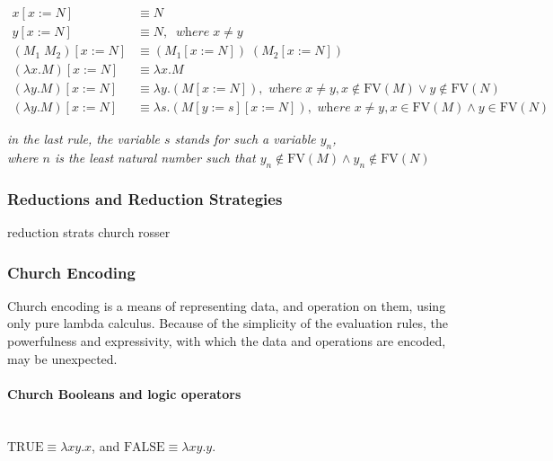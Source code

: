\documentclass[a4paper,10pt]{article}
\begin{document}
\begin{align*}
	x[x := N] &\equiv N\\
	y[x := N] &\equiv N,\;\;\textit{where}\;x \not= y\\
	(M_1\;M_2)[x := N] &\equiv (M_1[x := N])\;(M_2[x := N])\\
	(\lambda x.M)[x := N] &\equiv \lambda x.M\\
	(\lambda y.M)[x := N] &\equiv \lambda y.(M[x := N]),\textit{ where}\;x \not= y, x \not\in \mathrm{FV}(M) \lor y \not\in \mathrm{FV}(N)\\
	(\lambda y.M)[x := N] &\equiv \lambda s.(M[y := s][x := N]),\textit{ where}\;x \not= y, x\in \mathrm{FV}(M) \land y \in \mathrm{FV}(N)
\end{align*}
\begin{center}
\textit{in the last rule, the variable $s$ stands for such a variable $y_n$,
\\where $n$ is the least natural number such that $y_n \not\in \mathrm{FV}(M) \land y_n \not\in \mathrm{FV}(N)$}
\end{center}

\subsubsection{Reductions and Reduction Strategies}

reduction strats
church rosser

\subsubsection{Church Encoding}
Church encoding is a means of representing data, and operation on them, using
only pure lambda calculus. Because of the simplicity of the evaluation rules, the powerfulness
and expressivity, with which the data and operations are encoded, may be unexpected.

\paragraph{Church Booleans and logic operators}~\\

$\mathrm{TRUE} \equiv \lambda xy.x$, and $\mathrm{FALSE} \equiv \lambda xy.y$.
\end{document}
